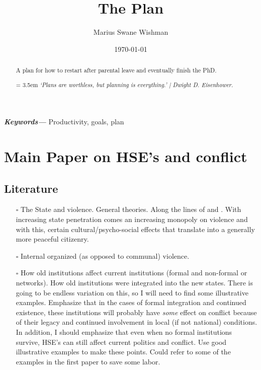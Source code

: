 \documentclass[12pt]{article}
\title{The Plan}
\author[1]{Marius Swane Wishman}
\affil[1]{Department of Sociology and Political Science, NTNU}
\date{\today}
\providecommand{\keywords}[1]
{
	\small	
	\textbf{\textit{Keywords---}} #1
}
\begin{document}
\maketitle

\begin{abstract}
	A plan for how to restart after parental leave and eventually finish the
	PhD.

\bigskip
\hangindent = 3.5em
\emph{`Plans are worthless, but planning is everything.' | 
		Dwight D. Eisenhower.
	}
\end{abstract}

\bigskip
\keywords{Productivity, goals, plan}

\pagebreak


\onehalfspacing

\section{Main Paper on HSE's and conflict}
\subsection{Literature}
\begin{itemize}
	\item[$\square$] The State and violence. General theories.
		Along the lines of \citet{Pinker2012} and \citet{Tilly1990}.
		With increasing state penetration comes an increasing monopoly
		on violence \citep{Tilly1990} and with this, certain
		cultural/psycho-social effects that translate into a generally
		more peaceful citizenry.
	\item[$\square$] Internal organized (as opposed to communal) violence.

	\item[$\square$] How old institutions affect current institutions
		(formal and non-formal or networks). How old institutions were
		integrated into the new states. There is going to be endless
		variation on this, so I will need to find some illustrative
		examples. Emphasize that in the cases of formal integration and
		continued existence, these institutions will probably have
		\emph{some} effect on conflict because of their legacy and
		continued involvement in local (if not national) conditions. In
		addition, I should emphasize that even when no formal
		institutions survive, HSE's can still affect current politics
		and conflict. Use good illustrative examples to make these
		points. Could refer to some of the examples in the first paper
		to save some labor.
\end{itemize}
\end{document}
